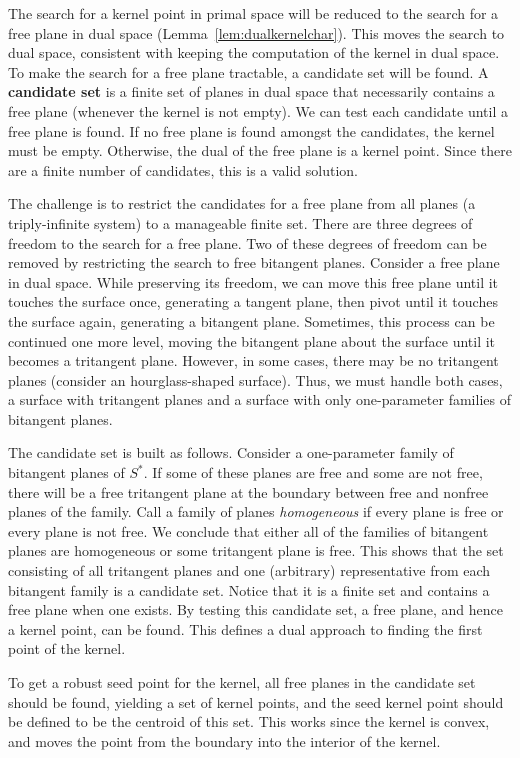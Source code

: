 \documentclass[twoside]{article}
\begin{document}
The search for a kernel point in primal space 
will be reduced to the search for a free plane in dual space
(Lemma~\ref{lem:dualkernelchar}).
This moves the search to dual space, consistent with keeping the computation
of the kernel in dual space.
To make the search for a free plane tractable, a candidate set will be found.
A {\bf candidate set} is a finite set of planes in dual space
that necessarily contains a free plane (whenever the kernel is not empty).
We can test each candidate until a free plane is found.
If no free plane is found amongst the candidates,
the kernel must be empty.
Otherwise, the dual of the free plane is a kernel point.
Since there are a finite number of candidates, this is a valid solution.

The challenge is to restrict the candidates for a free plane from
all planes (a triply-infinite system) to a manageable finite set.
There are three degrees of freedom to the search for a free plane.
Two of these degrees of freedom can be removed by restricting the search
to free bitangent planes.
Consider a free plane in dual space.
While preserving its freedom, we can move this free plane
until it touches the surface once, generating a tangent plane,
then pivot until it touches the surface again, generating a bitangent plane.
Sometimes, this process can be continued one more level,
moving the bitangent plane about the surface until it becomes a
tritangent plane.
However, in some cases, there may be no tritangent planes
(consider an hourglass-shaped surface).
Thus, we must handle both cases, a surface with tritangent planes
and a surface with only one-parameter families of bitangent planes.

The candidate set is built as follows.
Consider a one-parameter family of bitangent planes of $S^*$.
If some of these planes are free and some are not free,
there will be a free tritangent plane at the boundary
between free and nonfree planes of the family.
Call a family of planes {\em homogeneous} if every plane is
free or every plane is not free.
We conclude that either all of the families of bitangent planes
are homogeneous or some tritangent plane is free.
This shows that the set consisting of all tritangent planes
and one (arbitrary) representative from each bitangent family
is a candidate set.
Notice that it is a finite set and contains a free plane when one exists.
By testing this candidate set, a free plane, and hence a kernel point, can be found.
This defines a dual approach to finding the first point of the kernel.

To get a robust seed point for the kernel,
all free planes in the candidate set should be found,
yielding a set of kernel points, and the seed kernel point 
should be defined to be the centroid of this set.
This works since the kernel is convex, and moves the point from the boundary
into the interior of the kernel.
\end{document}
